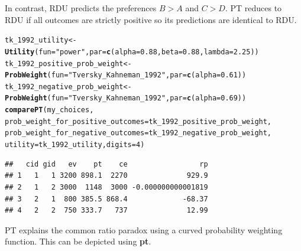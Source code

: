 \documentclass{article}\usepackage[]{graphicx}\usepackage[]{color}
\makeatletter
\newcommand{\hlnum}[1]{\textcolor[rgb]{0.686,0.059,0.569}{#1}}%
\newcommand{\hlstr}[1]{\textcolor[rgb]{0.192,0.494,0.8}{#1}}%
\newcommand{\hlstd}[1]{\textcolor[rgb]{0.345,0.345,0.345}{#1}}%
\newcommand{\hlkwb}[1]{\textcolor[rgb]{0.69,0.353,0.396}{#1}}%
\newcommand{\hlkwc}[1]{\textcolor[rgb]{0.333,0.667,0.333}{#1}}%
\newcommand{\hlkwd}[1]{\textcolor[rgb]{0.737,0.353,0.396}{\textbf{#1}}}%
\newenvironment{kframe}{%
 \def\at@end@of@kframe{}%
 \ifinner\ifhmode%
  \def\at@end@of@kframe{\end{minipage}}%
  \begin{minipage}{\columnwidth}%
 \fi\fi%
 \def\FrameCommand##1{\hskip\@totalleftmargin \hskip-\fboxsep
 \colorbox{shadecolor}{##1}\hskip-\fboxsep
     \hskip-\linewidth \hskip-\@totalleftmargin \hskip\columnwidth}%
 \MakeFramed {\advance\hsize-\width
   \@totalleftmargin\z@ \linewidth\hsize
   \@setminipage}}%
 {\par\unskip\endMakeFramed%
 \at@end@of@kframe}
\newenvironment{knitrout}{}{} %
\makeatother
\begin{document}
In contrast, RDU predicts the preferences $B > A$ and $C > D$. PT reduces to RDU if all outcomes are strictly positive so its predictions are identical to RDU.

\begin{knitrout}
\color{fgcolor}\begin{kframe}
\begin{alltt}
\hlstd{tk_1992_utility} \hlkwb{<-} \hlkwd{Utility}\hlstd{(}\hlkwc{fun}\hlstd{=}\hlstr{"power"}\hlstd{,} \hlkwc{par}\hlstd{=}\hlkwd{c}\hlstd{(}\hlkwc{alpha}\hlstd{=}\hlnum{0.88}\hlstd{,} \hlkwc{beta}\hlstd{=}\hlnum{0.88}\hlstd{,} \hlkwc{lambda}\hlstd{=}\hlnum{2.25}\hlstd{))}
\hlstd{tk_1992_positive_prob_weight} \hlkwb{<-} \hlkwd{ProbWeight}\hlstd{(}\hlkwc{fun}\hlstd{=}\hlstr{"Tversky_Kahneman_1992"}\hlstd{,} \hlkwc{par}\hlstd{=}\hlkwd{c}\hlstd{(}\hlkwc{alpha}\hlstd{=}\hlnum{0.61}\hlstd{))}
\hlstd{tk_1992_negative_prob_weight} \hlkwb{<-} \hlkwd{ProbWeight}\hlstd{(}\hlkwc{fun}\hlstd{=}\hlstr{"Tversky_Kahneman_1992"}\hlstd{,} \hlkwc{par}\hlstd{=}\hlkwd{c}\hlstd{(}\hlkwc{alpha}\hlstd{=}\hlnum{0.69}\hlstd{))}
\hlkwd{comparePT}\hlstd{(my_choices,}
        \hlkwc{prob_weight_for_positive_outcomes}\hlstd{=tk_1992_positive_prob_weight,}
        \hlkwc{prob_weight_for_negative_outcomes}\hlstd{=tk_1992_negative_prob_weight,}
        \hlkwc{utility}\hlstd{=tk_1992_utility,} \hlkwc{digits}\hlstd{=}\hlnum{4}\hlstd{)}
\end{alltt}
\begin{verbatim}
##   cid gid   ev    pt    ce                 rp
## 1   1   1 3200 898.1  2270              929.9
## 2   1   2 3000  1148  3000 -0.000000000001819
## 3   2   1  800 385.5 868.4             -68.37
## 4   2   2  750 333.7   737              12.99
\end{verbatim}
\end{kframe}
\end{knitrout}


PT explains the common ratio paradox using a curved probability weighting function. This can be depicted using {\bf pt}.
\end{document}
